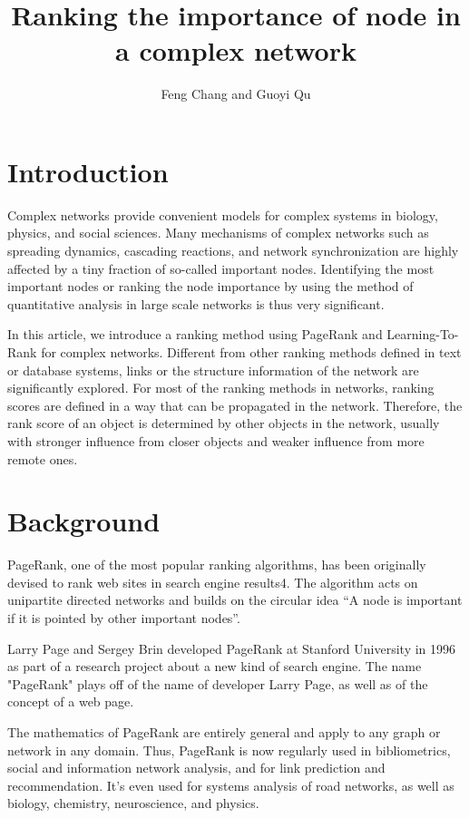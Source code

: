 \documentclass{acmtog} %
\title{Ranking the importance of node in a complex network} %
\author{Feng Chang {\upshape and} Guoyi Qu
\affil{Shanghai Jiao Tong University}
}
\begin{document}
\maketitle
\section{Introduction}
Complex networks provide convenient models for complex systems in biology, physics, and social sciences.\cite{ref1} Many mechanisms of complex networks such as spreading dynamics, cascading reactions, and network synchronization are highly affected by a tiny fraction of so-called important nodes. Identifying the most important nodes or ranking the node importance by using the method of quantitative analysis in large scale networks is thus very significant.

In this article, we introduce a ranking method using PageRank and Learning-To-Rank for complex networks. Different from other ranking methods defined in text or database systems, links or the structure information of the network are significantly explored. For most of the ranking methods in networks, ranking scores are defined in a way that can be propagated in the network. Therefore, the rank score of an object is determined by other objects in the network, usually with stronger influence from closer objects and weaker influence from more remote ones.\cite{ref2}

\section{Background}
PageRank, one of the most popular ranking algorithms, has been originally devised to rank web sites in search engine results4. The algorithm acts on unipartite directed networks and builds on the circular idea “A node is important if it is pointed by other important nodes”. 

Larry Page and Sergey Brin developed PageRank at Stanford University in 1996 as part of a research project about a new kind of search engine. The name "PageRank" plays off of the name of developer Larry Page, as well as of the concept of a web page.\cite{ref3}

The mathematics of PageRank are entirely general and apply to any graph or network in any domain. Thus, PageRank is now regularly used in bibliometrics, social and information network analysis, and for link prediction and recommendation. It's even used for systems analysis of road networks, as well as biology, chemistry, neuroscience, and physics.
\end{document}
